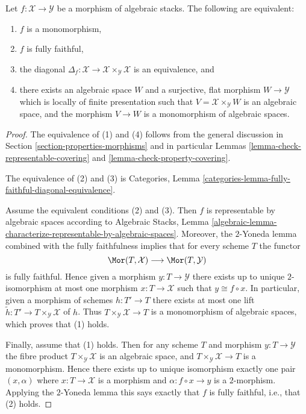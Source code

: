 \begin{lemma}
\label{lemma-monomorphism}
Let $f : \mathcal{X} \to \mathcal{Y}$ be a morphism of algebraic stacks.
The following are equivalent:
\begin{enumerate}
\item $f$ is a monomorphism,
\item $f$ is fully faithful,
\item the diagonal
$\Delta_f : \mathcal{X} \to \mathcal{X} \times_\mathcal{Y} \mathcal{X}$
is an equivalence, and
\item there exists an algebraic space $W$ and a surjective, flat morphism
$W \to \mathcal{Y}$ which is locally of finite presentation such that
$V = \mathcal{X} \times_\mathcal{Y} W$ is an algebraic space, and the
morphism $V \to W$ is a monomorphism of algebraic spaces.
\end{enumerate}
\end{lemma}

\begin{proof}
The equivalence of (1) and (4) follows from the general discussion in
Section \ref{section-properties-morphisms}
and in particular
Lemmas \ref{lemma-check-representable-covering} and
\ref{lemma-check-property-covering}.

\medskip\noindent
The equivalence of (2) and (3) is
Categories, Lemma \ref{categories-lemma-fully-faithful-diagonal-equivalence}.

\medskip\noindent
Assume the equivalent conditions (2) and (3). Then $f$ is representable
by algebraic spaces according to
Algebraic Stacks,
Lemma \ref{algebraic-lemma-characterize-representable-by-algebraic-spaces}.
Moreover, the $2$-Yoneda lemma combined with the fully faithfulness
implies that for every scheme $T$ the functor
$$
\Mor(T, \mathcal{X})
\longrightarrow
\Mor(T, \mathcal{Y})
$$
is fully faithful. Hence given a morphism $y : T \to \mathcal{Y}$ there exists
up to unique $2$-isomorphism at most one morphism $x : T \to \mathcal{X}$
such that $y \cong f \circ x$. In particular, given a morphism of schemes
$h : T' \to T$ there exists at most one lift
$\tilde h : T' \to T \times_\mathcal{Y} \mathcal{X}$ of $h$.
Thus $T \times_\mathcal{Y} \mathcal{X} \to T$ is a monomorphism of
algebraic spaces, which proves that (1) holds.

\medskip\noindent
Finally, assume that (1) holds. Then for any scheme $T$ and morphism
$y : T \to \mathcal{Y}$ the fibre product $T \times_\mathcal{Y} \mathcal{X}$
is an algebraic space, and $T \times_\mathcal{Y} \mathcal{X} \to T$
is a monomorphism. Hence there exists up to unique isomorphism
exactly one pair $(x, \alpha)$ where $x : T \to \mathcal{X}$ is a morphism
and $\alpha : f \circ x \to y$ is a $2$-morphism. Applying
the $2$-Yoneda lemma this says exactly that $f$ is fully faithful, i.e.,
that (2) holds.
\end{proof}

